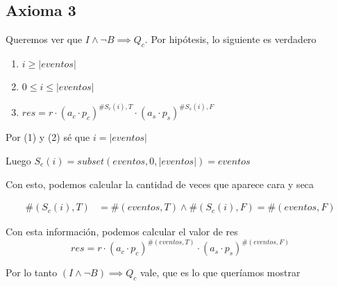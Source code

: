 \documentclass[../document.tex]{subfiles}
\begin{document}
\subsection*{Axioma 3}

Queremos ver que $I\land \neg B \implies Q_c$. Por hipótesis, lo siguiente es verdadero

\begin{enumerate}
    \item $i \geq |eventos|$
    \item $0\leq i \leq |eventos|$
    \item $res=r\cdot (a_c\cdot p_c)^{\#S_c(i),T}\cdot (a_s\cdot p_s)^{\#S_s(i),F}$
\end{enumerate}

Por (1) y (2) sé que $i=|eventos|$

Luego $S_e(i)=subset(eventos, 0, |eventos|)=eventos$

Con esto, podemos calcular la cantidad de veces que aparece cara y seca 

\begin{equation}
\begin{split}
    \#(S_c(i),T)&=\#(eventos,T)\land \#(S_c(i),F)=\#(eventos,F)
\end{split}
\end{equation}

Con esta información, podemos calcular el valor de res
\begin{equation}
res=r\cdot (a_c\cdot p_c)^{\#(eventos,T)}\cdot (a_s\cdot p_s)^{\#(eventos,F)}
\end{equation}

Por lo tanto $(I\land \neg B)\implies Q_c$ vale, que es lo que queríamos mostrar
\end{document}
